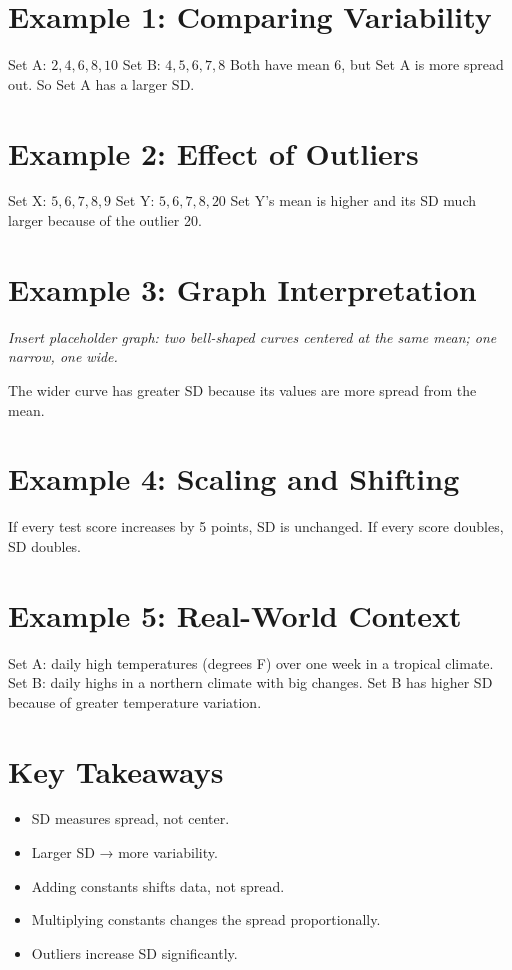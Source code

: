 \documentclass[12pt]{article}
\begin{document}
\section*{Example 1: Comparing Variability}

Set A: \(2, 4, 6, 8, 10\)  
Set B: \(4, 5, 6, 7, 8\)  
Both have mean 6, but Set A is more spread out. So Set A has a larger SD.

\section*{Example 2: Effect of Outliers}

Set X: \(5, 6, 7, 8, 9\)  
Set Y: \(5, 6, 7, 8, 20\)  
Set Y’s mean is higher and its SD much larger because of the outlier 20.

\section*{Example 3: Graph Interpretation}

\textit{Insert placeholder graph: two bell-shaped curves centered at the same mean; one narrow, one wide.}

The wider curve has greater SD because its values are more spread from the mean.

\section*{Example 4: Scaling and Shifting}

If every test score increases by 5 points, SD is unchanged.  
If every score doubles, SD doubles.

\section*{Example 5: Real-World Context}

Set A: daily high temperatures (degrees F) over one week in a tropical climate.  
Set B: daily highs in a northern climate with big changes.  
Set B has higher SD because of greater temperature variation.

\section*{Key Takeaways}
\begin{itemize}
  \item SD measures spread, not center.
  \item Larger SD → more variability.
  \item Adding constants shifts data, not spread.
  \item Multiplying constants changes the spread proportionally.
  \item Outliers increase SD significantly.
\end{itemize}
\end{document}
